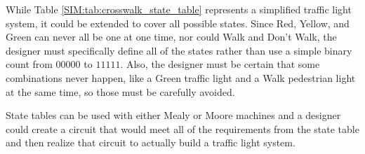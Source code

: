 While Table \ref{SIM:tab:crosswalk_state_table} represents a simplified traffic light system, it could be extended to cover all possible states. Since Red, Yellow, and Green can never all be one at one time, nor could Walk and Don't Walk, the designer must specifically define all of the states rather than use a simple binary count from $ 00000 $ to $ 11111 $. Also, the designer must be certain that some combinations never happen, like a Green traffic light and a Walk pedestrian light at the same time, so those must be carefully avoided. 

State tables can be used with either Mealy or Moore machines and a designer could create a circuit that would meet all of the requirements from the state table and then realize that circuit to actually build a traffic light system. 


